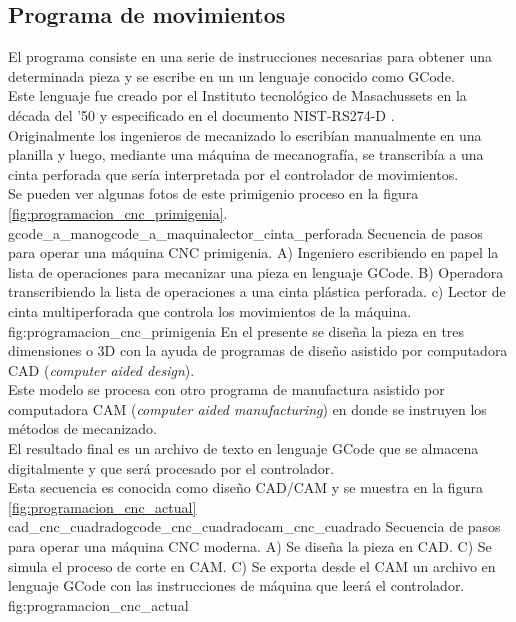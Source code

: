 \subsection{Programa de movimientos}
   El programa consiste en una serie de instrucciones necesarias para obtener una determinada pieza y se escribe en un un lenguaje conocido como GCode\citep{WEBSITE:gcode_wiki}.\\
   Este lenguaje fue creado por el Instituto tecnológico de Masachussets en la década del '50 y especificado en el documento NIST-RS274-D \citep{rs274}.\\
Originalmente los ingenieros de mecanizado lo escribían manualmente en una planilla y luego, mediante una máquina de mecanografía, se transcribía a una cinta perforada que sería interpretada por el controlador de movimientos.\\
Se pueden ver algunas fotos de este primigenio proceso en la figura \ref{fig:programacion_cnc_primigenia}.
          {gcode_a_mano}{gcode_a_maquina}{lector_cinta_perforada}
          {Secuencia de pasos para operar una máquina CNC primigenia. A) Ingeniero escribiendo en papel la lista de operaciones para mecanizar una pieza en lenguaje GCode. B) Operadora transcribiendo la lista de operaciones a una cinta plástica perforada. c) Lector de cinta multiperforada que controla los movimientos de la máquina.}
          {fig:programacion_cnc_primigenia}
          En el presente se diseña la pieza en tres dimensiones o 3D con la ayuda de programas de diseño asistido por computadora CAD  (\textit{computer aided design}).\\
   Este modelo se procesa con otro programa de manufactura asistido por computadora CAM (\textit{computer aided manufacturing}) en donde se instruyen los métodos de mecanizado.\\
   El resultado final es un archivo de texto en lenguaje GCode que se almacena digitalmente y que será procesado por el controlador.\\
          Esta secuencia es conocida como diseño CAD/CAM y se muestra en la figura \ref{fig:programacion_cnc_actual}
          {cad_cnc_cuadrado}{gcode_cnc_cuadrado}{cam_cnc_cuadrado}
          {Secuencia de pasos para operar una máquina CNC moderna. A) Se diseña la pieza en CAD. C) Se simula el proceso de corte en CAM. C) Se exporta desde el CAM un archivo en lenguaje GCode con las instrucciones de máquina que leerá el controlador.}
          {fig:programacion_cnc_actual}

